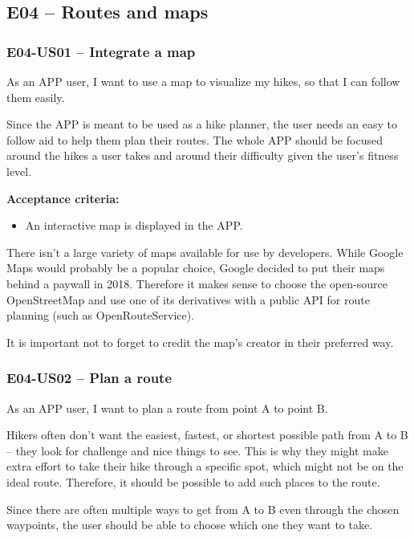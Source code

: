 
\subsection*{E04 -- Routes and maps}

\subsubsection*{E04-US01 -- Integrate a map}
As an APP user, I want to use a map to visualize my hikes, so that I can follow them easily.

Since the APP is meant to be used as a hike planner, the user needs an easy to follow aid to help them plan their routes.
The whole APP should be focused around the hikes a user takes and around their difficulty given the user's fitness level.

\textbf{Acceptance criteria:}
\begin{itemize}
    \item An interactive map is displayed in the APP.
\end{itemize}

There isn't a large variety of maps available for use by developers.
While Google Maps would probably be a popular choice, Google decided to put their maps behind a paywall\cite{google-maps-paywall} in 2018.
Therefore it makes sense to choose the open-source OpenStreetMap\cite{OpenStreetMap} and use one of its derivatives with a public API for route planning (such as OpenRouteService\cite{OpenRouteService}).

It is important not to forget to credit the map's creator in their preferred way.

\subsubsection*{E04-US02 -- Plan a route}
As an APP user, I want to plan a route from point A to point B.

Hikers often don't want the easiest, fastest, or shortest possible path from A to B -- they look for challenge and nice things to see.
This is why they might make extra effort to take their hike through a specific spot, which might not be on the ideal route.
Therefore, it should be possible to add such places to the route.

Since there are often multiple ways to get from A to B even through the chosen waypoints, the user should be able to choose which one they want to take.

